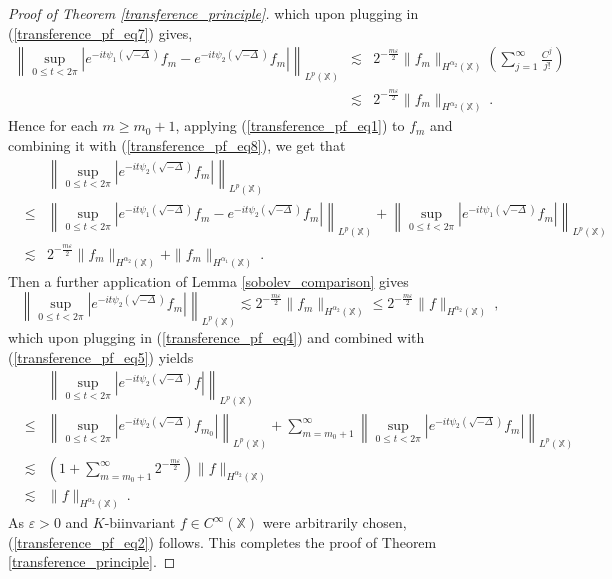 \documentclass[10pt,a4paper]{amsart}
\newcommand{\X}{\mathbb X}%
\begin{document}
\begin{proof}[Proof of Theorem \ref{transference_principle}]
which upon plugging in (\ref{transference_pf_eq7}) gives,
\begin{eqnarray} \label{transference_pf_eq8}
\left\|\sup_{0\le t<2\pi}\left|e^{-it\psi_1\left(\sqrt{-\Delta}\right)} f_m   - e^{-it\psi_2\left(\sqrt{-\Delta}\right)} f_m \right|\right\|_{L^p(\X)} &\lesssim & 2^{-\frac{m\varepsilon}{2}} \|f_m\|_{H^{\alpha_2}(\X)}\left(\sum_{j=1}^\infty \frac{C^j}{j!}\right)\nonumber\\
& \lesssim &  2^{-\frac{m\varepsilon}{2}} \|f_m\|_{H^{\alpha_2}(\X)}\:.
\end{eqnarray}
Hence for each $m \ge m_0+1$, applying (\ref{transference_pf_eq1}) to $f_m$ and combining it with (\ref{transference_pf_eq8}), we get that
\begin{eqnarray*}
&&\left\|\sup_{0 \le t < 2\pi} \left|e^{-it\psi_2\left(\sqrt{-\Delta}\right)} f_m \right|\right\|_{L^p(\X)} \\
&\le & \left\|\sup_{0\le t<2\pi}\left|e^{-it\psi_1\left(\sqrt{-\Delta}\right)} f_m   - e^{-it\psi_2\left(\sqrt{-\Delta}\right)} f_m \right|\right\|_{L^p(\X)} + \left\|\sup_{0 \le t < 2\pi} \left|e^{-it\psi_1\left(\sqrt{-\Delta}\right)} f_m \right|\right\|_{L^p(\X)} \\
& \lesssim &  2^{-\frac{m\varepsilon}{2}} \|f_m\|_{H^{\alpha_2}(\X)} + \|f_m\|_{H^{\alpha_1}(\X)}\:.
\end{eqnarray*}
Then a further application of Lemma \ref{sobolev_comparison} gives
\begin{equation*}
\left\|\sup_{0 \le t < 2\pi} \left|e^{-it\psi_2\left(\sqrt{-\Delta}\right)} f_m \right|\right\|_{L^p(\X)} \lesssim 2^{-\frac{m\varepsilon}{2}} \|f_m\|_{H^{\alpha_2}(\X)} \le 2^{-\frac{m\varepsilon}{2}} \|f\|_{H^{\alpha_2}(\X)}\:,
\end{equation*}
which upon plugging in (\ref{transference_pf_eq4}) and combined with (\ref{transference_pf_eq5}) yields
\begin{eqnarray*}
&&\left\|\sup_{0 \le t < 2\pi} \left|e^{-it\psi_2\left(\sqrt{-\Delta}\right)} f \right|\right\|_{L^p(\X)}\\
 & \le & \left\|\sup_{0 \le t < 2\pi} \left|e^{-it\psi_2\left(\sqrt{-\Delta}\right)} f_{m_0} \right|\right\|_{L^p(\X)} + \sum_{m=m_0+1}^\infty \left\|\sup_{0 \le t < 2\pi} \left|e^{-it\psi_2\left(\sqrt{-\Delta}\right)} f_m \right|\right\|_{L^p(\X)} \\
&\lesssim & \left(1+\sum_{m=m_0+1}^\infty 2^{-\frac{m\varepsilon}{2}} \right)  \|f\|_{H^{\alpha_2}(\X)} \\
&\lesssim &  \|f\|_{H^{\alpha_2}(\X)}\:.
\end{eqnarray*}
As $\varepsilon>0$ and $K$-biinvariant $f \in C^\infty(\X)$ were arbitrarily chosen, (\ref{transference_pf_eq2}) follows. This completes the proof of Theorem \ref{transference_principle}.
\end{proof}
\end{document}
